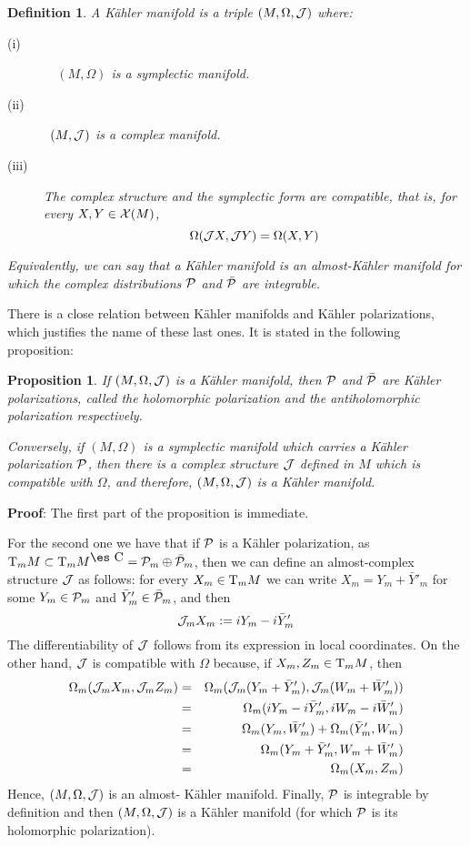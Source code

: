 \documentclass[12pt]{article}
\theoremstyle{plain}
\newtheorem{prop}{Proposition}
\newtheorem{definition}{Definition}
\def\beann{\begin{eqnarray*}}
\def\eeann{\end{eqnarray*}}
\def\qed{\ifvmode\removelastskip\fi
{\unskip\nobreak\hfil\penalty50\hbox{}\nobreak\hfil
\hbox{\vrule height1.2ex width1.2ex}\parfillskip=0pt
\finalhyphendemerits=0 \par\smallskip}}
\def\P{{\cal P}}
\def\Complex{\mbox{\es C}}
\def\Tan{{\rm T}}
\begin{document}
\begin{definition}
A {\rm K\"ahler manifold} is a triple $(M,\Omega ,{\cal J})$ where:
\begin{description}
\item[{\rm (i)}]\ \
$(M,\Omega )$ is a symplectic manifold.
\item[{\rm (ii)}]\
$(M,{\cal J})$ is a complex manifold.
\item[{\rm (iii)}]
The complex structure and the symplectic form
are compatible, that is, for every $X,Y \in {\cal X}(M)$,
$$
\Omega ({\cal J}X,{\cal J}Y) =  \Omega (X,Y)
$$
\end{description}

Equivalently, we can say that a K\"ahler manifold
is an almost-K\"ahler manifold for which
the complex distributions $\P$ and $\bar \P$ are integrable.
\end{definition}

There is a close relation between K\"ahler manifolds
and K\"ahler polarizations,
which justifies the name of these last ones.
It is stated in the following proposition:

\begin{prop}
If $(M,\Omega ,{\cal J})$ is a K\"ahler manifold,
then $\P$ and $\bar \P$ are K\"ahler polarizations,
called the {\rm holomorphic polarization} and
the {\rm antiholomorphic polarization} respectively.

Conversely, if $(M,\Omega)$ is a symplectic manifold
which carries a K\"ahler polarization $\P$,
then there is a complex structure ${\cal J}$ defined in $M$
which is compatible with $\Omega$,
and therefore, $(M,\Omega ,{\cal J})$ is a K\"ahler manifold.
\end{prop}
{\bf Proof}: 
The first part of the proposition is immediate.

For the second one we have that
if $\P$ is a K\"ahler polarization, as
$\Tan_mM \subset \Tan_m M^{\Complex} = \P_m \oplus \bar \P_m$,
then we can define an almost-complex structure ${\cal J}$
as follows: for every $X_m \in \Tan_m M$
we can write $X_m = Y_m + \bar Y'_m$ for some
$Y_m \in \P_m$ and $\bar Y'_m \in \bar \P_m$,
and then
$$
{\cal J}_mX_m := iY_m - i\bar Y'_m
$$
The differentiability of ${\cal J}$ follows from
its expression in local coordinates.
On the other hand, ${\cal J}$ is compatible with $\Omega$
because, if $X_m,Z_m \in \Tan_m M$, then
\beann
\Omega_m ({\cal J}_mX_m,{\cal J}_mZ_m)&=&
\Omega_m ({\cal J}_m(Y_m+\bar Y'_m),{\cal J}_m(W_m+\bar W'_m))\\
&=& \Omega_m (iY_m-i\bar Y'_m,iW_m-i\bar W'_m)
\\
&=&\Omega_m (Y_m,\bar W'_m) + \Omega_m (\bar Y'_m,W_m)\\
&=&\Omega_m (Y_m+\bar Y'_m,W_m+\bar W'_m)\\
&=& \Omega_m (X_m,Z_m)
\eeann
Hence, $(M,\Omega ,{\cal J})$ is an almost- K\"ahler manifold.
Finally, $\P$ is integrable by definition
and then $(M,\Omega ,{\cal J})$ is a K\"ahler manifold
(for which $\P$ is its holomorphic polarization).
\qed
\end{document}
